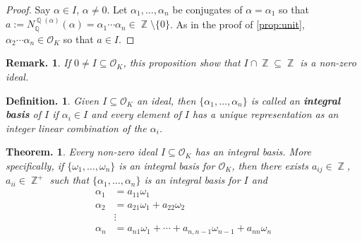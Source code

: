 \documentclass[11pt, a4paper]{memoir}
\DeclareMathOperator{\Q}{{\mathbb{Q}}}
\DeclareMathOperator{\Z}{{\mathbb{Z}}}
\theoremstyle{change}
\newtheorem{theorem}{Theorem.}[section]
\theoremstyle{plain}
\theoremstyle{nonumberplain}
\newtheorem{definition}{Definition.}
\newtheorem{remark}{Remark.}
\newtheorem{proof}{Proof}
\newcommand{\mbf}[1]{{\boldmath\bfseries #1}}
\numberwithin{equation}{section}
\begin{document}
\begin{proof}
    Say $\alpha\in I$, $\alpha\neq 0$.
    Let $\alpha_1,\ldots,\alpha_n$ be conjugates of $\alpha=\alpha_1$ so that $a:=N_{\Q}^{\Q(\alpha)}(\alpha)=\alpha_1\cdots\alpha_n\in\Z\setminus\{0\}$.
    As in the proof of \cref{prop:unit}, $\alpha_2\cdots\alpha_n\in\mathcal{O}_K$ so that $a\in I$.
\end{proof}
\begin{remark}
    If $0\neq I\subseteq\mathcal{O}_K$, this proposition show that $I\cap\Z\subseteq\Z$ is a non-zero ideal.
\end{remark}
\begin{definition}
    Given $I\subseteq\mathcal{O}_K$ an ideal, then $\{\alpha_1,\ldots,\alpha_n\}$ is called an \mbf{integral basis} of $I$ if $\alpha_i\in I$ and every element of $I$ has a unique representation as an integer linear combination of the $\alpha_i$.
\end{definition}
\begin{theorem}\label{thm:id-basis}
    Every non-zero ideal $I\subseteq\mathcal{O}_K$ has an integral basis.
    More specifically, if $\{\omega_1,\ldots,\omega_n\}$ is an integral basis for $\mathcal{O}_K$, then there exists $a_{ij}\in\Z$, $a_{ii}\in\Z^+$ such that $\{\alpha_1,\ldots,\alpha_n\}$ is an integral basis for $I$ and
    \begin{align*}
        \alpha_1 &= a_{11}\omega_1\\
        \alpha_2 &= a_{21}\omega_1+a_{22}\omega_2\\
                 &\vdots\\
        \alpha_n &= a_{n1}\omega_1+\cdots+a_{n,n-1}\omega_{n-1}+a_{nn}\omega_n
    \end{align*}
\end{theorem}
\end{document}
